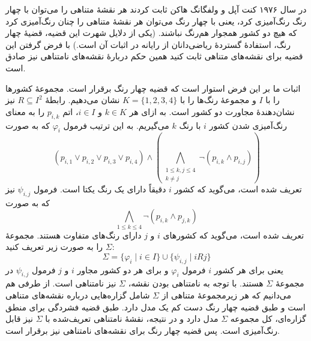 در سال ۱۹۷۶ کنت آپل و ولفگانگ هاکن ثابت کردند هر نقشهٔ متناهی را می‌توان با چهار رنگ رنگ‌آمیزی کرد، یعنی با چهار رنگ می‌توان هر نقشهٔ متناهی را چنان رنگ‌آمیزی کرد که هیچ دو کشور همجوار هم‌رنگ نباشند. (یکی از دلایل شهرت این قضیه، قضیهٔ چهار رنگ، استفادهٔ گستردهٔ ریاضی‌دانان از رایانه در اثبات آن است.) با فرض گرفتن این قضیه برای نقشه‌های متناهی ثابت کنید همین حکم دربارهٔ نقشه‌های نامتناهی نیز صادق است.
\begin{ans}
    اثبات ما بر این فرض استوار است که قضیه چهار رنگ برقرار است. مجموعهٔ کشورها را با $I$ و مجموعهٔ رنگ‌ها را با $K = \{1, 2, 3, 4\}$ نشان می‌دهیم. رابطهٔ $R \subseteq I^2$ نیز نشان‌دهندهٔ مجاورت دو کشور است. به ازای هر $k \in K$ و $i \in I$، اتم $p_{i,k}$ را به معنای رنگ‌آمیزی شدن کشور $i$ با رنگ $k$ می‌گیریم.
    به این ترتیب فرمول $\varphi_i$ که به صورت
    \[ (p_{i,1} \vee p_{i,2} \vee p_{i,3} \vee p_{i,4}) \land (\bigwedge_{\substack{1 \le k, j \le 4 \\ k \neq j}} \neg(p_{i,k} \wedge p_{i,j})) \]
    تعریف شده است، می‌گوید که کشور $i$ دقیقاً دارای یک رنگ یکتا است. فرمول $\psi_{i, j}$ نیز که به صورت
    \[ \bigwedge_{1 \le k \le 4} \neg (p_{i,k} \wedge p_{j,k}) \]
    تعریف شده است، می‌گوید که کشورهای $i$ و $j$ دارای رنگ‌های متفاوت هستند. مجموعهٔ $\Sigma$ را به صورت زیر تعریف کنید:
    \[ \Sigma = \{ \varphi_i  \mid i \in I \} \cup \{ \psi_{i, j} \mid i R j \} \]
    یعنی برای هر کشور $i$ فرمول $\varphi_i$ و برای هر دو کشور مجاور $i$ و $j$ فرمول $\psi_{i, j}$ در مجموعهٔ $\Sigma$ هستند. با توجه به نامتناهی بودن نقشه، $\Sigma$ نیز نامتناهی است. از طرفی هم می‌دانیم که هر زیرمجموعهٔ متناهی از $\Sigma$ شامل گزاره‌هایی درباره نقشه‌های متناهی است و طبق قضیه چهار رنگ دست کم یک مدل دارد. طبق قضیه فشردگی برای منطق گزاره‌ای، کل مجموعه $\Sigma$ مدل دارد و در نتیجه، نقشهٔ نامتناهی تعریف‌شده با $\Sigma$ نیز قابل رنگ‌آمیزی است. پس قضیه چهار رنگ برای نقشه‌های نامتناهی نیز برقرار است.
\end{ans}
